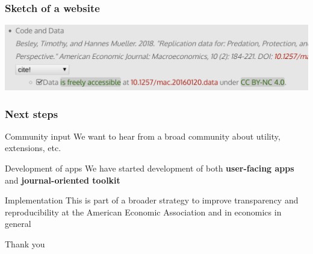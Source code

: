 \begin{frame}
\frametitle{Sketch of a website}
\includegraphics[width=0.8\paperwidth]{images/aeaweb-demo2.png}
\end{frame}



\begin{frame}
\frametitle{Next steps}
\begin{block}{Community input}
	We want to hear from a broad community about utility, extensions, etc.
\end{block}
\begin{block}{Development of apps}
	We have started development of both \textbf{user-facing apps} and \textbf{journal-oriented toolkit}
\end{block}
\begin{block}{Implementation}
	This is part of a broader strategy to improve transparency and reproducibility at the American Economic Association and in economics in general
\end{block}
\end{frame}


\begin{frame}
\centering \Huge Thank you
\end{frame}
